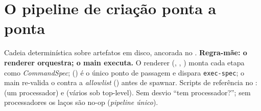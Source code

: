 \section{O pipeline de criação ponta a ponta}
\label{sec:S14-pipeline-ponta-a-ponta}

Cadeia determinística sobre artefatos em disco, ancorada no .
\textbf{Regra-mãe: o renderer orquestra; o main executa.} O renderer
(, ,
) monta cada etapa como \emph{CommandSpec};
 () é o único ponto de passagem e dispara
\lstinline|exec-spec|; o main re-valida o  contra a \emph{allowlist}
() antes de spawnar. Scripts de referência no
:  (um processador) e 
(vários sob top-level). Sem desvio ``tem processador?''; sem processadores os laços
são no-op (\emph{pipeline único}).


